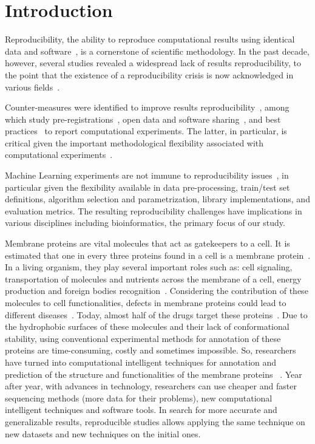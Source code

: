 \section {Introduction}


Reproducibility, the ability to reproduce computational results using
identical data and software~\cite{peng2011reproducible}, is a cornerstone
of scientific methodology. In the past decade, however, several studies
revealed a widespread lack of results reproducibility, to the
point that the existence of a reproducibility crisis is now acknowledged in
various fields~\cite{baker2016reproducibility}.

Counter-measures were identified to improve results
reproducibility~\cite{sandve2013ten}, among which study
pre-registrations~\cite{chambers2015registered}, open data and software
sharing~\cite{wilkinson2016fair}, and best
practices~\cite{nichols2017best} to report computational experiments. The
latter, in particular, is critical given the important methodological
flexibility associated with computational
experiments~\cite{carp2012plurality}.

Machine Learning experiments are not immune to reproducibility
issues~\cite{raff2019step}, in particular given the flexibility available in
data pre-processing, train/test set definitions, algorithm selection and
parametrization, library implementations, and evaluation metrics. The resulting 
reproducibility challenges have implications in various
disciplines including bioinformatics, the primary focus of our study.

{Membrane proteins are vital molecules that act as gatekeepers to a cell. 
It is estimated that one in every three proteins found in a cell is a membrane protein~\cite{cell2016Membranes}. 
In a living organism, they play several important roles such as: 
cell signaling,  transportation of  molecules and nutrients across the membrane of a cell, 
energy production and foreign bodies recognition~\cite{kozma2012pdbtm}. Considering the contribution of 
these molecules to cell functionalities, defects in membrane proteins could lead to 
different diseases~\cite{gromiha2014bioinformatics}. 
Today, almost half of the drugs target these proteins~\cite{butt2017treatise}. 
Due to the hydrophobic surfaces of these molecules and their lack of conformational stability, 
using conventional experimental methods for annotation of these proteins are time-consuming, 
costly and sometimes impossible. So, researchers have turned into computational 
intelligent techniques for annotation and prediction of the structure and functionalities of the membrane proteins
~\cite{gromiha2006discrimination,gromiha2008functional,ou2010classification,schaadt2012functional,butt2016prediction}. 
Year after year, with advances in technology, researchers can use cheaper and 
faster sequencing methods (more data for their problems), new computational intelligent 
techniques and software tools. In search for more accurate and generalizable results, 
reproducible studies allows applying the same technique on new datasets and new techniques 
on the initial ones.}

